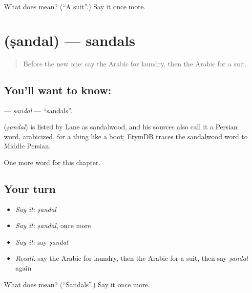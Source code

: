 \begin{tcolorbox}[breakable,colback=teal!4,colframe=teal!35!black,title={Before you move on}]
What does  mean? (\textquotedblleft{}A suit\textquotedblright{}.) Say it once more.
\end{tcolorbox}
\section[\texorpdfstring{\ar{صندل} (ṣandal)}{صندل (ṣandal)}]{ (ṣandal) — sandals}

\label{lesson:AR-C214-sandal}



\begin{quote}
Before the new one: say the Arabic for laundry, then the Arabic for a suit.
\end{quote}

\subsection*{You'll want to know: }
\textbf{} — \emph{ṣandal} — \textquotedblleft{}sandals\textquotedblright{}.

\begin{cousinweb}
\textbf{} (\emph{ṣandal}) is listed by Lane as sandalwood, and his sources also call it a Persian word, arabicized, for a thing like a boot; EtymDB traces the sandalwood word to Middle Persian.
\end{cousinweb}

\begin{grammarlens}[title={What you've built}]
One more word for this chapter.
\end{grammarlens}

\subsection*{Your turn}
\begin{itemize}
\raggedright
  \item \emph{Say it:} \emph{ṣandal}
  \item \emph{Say it:} \emph{ṣandal}, once more
  \item \emph{Say it:} say \emph{ṣandal}
  \item \emph{Recall:} say the Arabic for laundry, then the Arabic for a suit, then say \emph{ṣandal} again
\end{itemize}

\begin{tcolorbox}[breakable,colback=teal!4,colframe=teal!35!black,title={Before you move on}]
What does  mean? (\textquotedblleft{}Sandals\textquotedblright{}.) Say it once more.
\end{tcolorbox}
